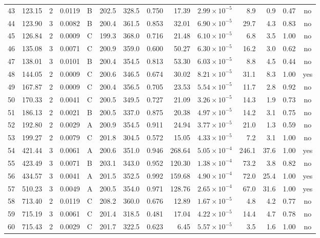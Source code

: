 \begin{landscape}
\begin{longtable}{rrrrlrrrrrrrrc}
43 & 123.15 & 2 & 0.0119 & B & 202.5 & 328.5 & 0.750 & 17.39 & $2.99\times10^{-5}$ & 8.9 & 0.9 & 0.47 & no \\
44 & 123.90 & 3 & 0.0082 & B & 200.4 & 361.5 & 0.853 & 32.01 & $6.90\times10^{-5}$ & 29.7 & 4.3 & 0.83 & no \\
45 & 126.84 & 2 & 0.0009 & C & 199.3 & 368.0 & 0.716 & 21.48 & $6.10\times10^{-5}$ & 6.8 & 3.5 & 1.00 & no \\
46 & 135.08 & 3 & 0.0071 & C & 200.9 & 359.0 & 0.600 & 50.27 & $6.30\times10^{-5}$ & 16.2 & 3.0 & 0.62 & no \\
47 & 138.01 & 3 & 0.0101 & B & 200.4 & 354.5 & 0.813 & 53.30 & $6.03\times10^{-5}$ & 8.8 & 4.5 & 0.44 & no \\
48 & 144.05 & 2 & 0.0009 & C & 200.6 & 346.5 & 0.674 & 30.02 & $8.21\times10^{-5}$ & 31.1 & 8.3 & 1.00 & yes \\
49 & 167.87 & 2 & 0.0009 & C & 200.4 & 356.5 & 0.705 & 23.53 & $5.54\times10^{-5}$ & 11.7 & 2.8 & 0.92 & no \\
50 & 170.33 & 2 & 0.0041 & C & 200.5 & 349.5 & 0.727 & 21.09 & $3.26\times10^{-5}$ & 14.3 & 1.9 & 0.73 & no \\
51 & 186.13 & 2 & 0.0021 & B & 200.5 & 337.0 & 0.875 & 20.38 & $4.97\times10^{-5}$ & 14.2 & 3.1 & 0.75 & no \\
52 & 192.80 & 2 & 0.0029 & A & 200.9 & 354.5 & 0.911 & 24.94 & $3.77\times10^{-5}$ & 21.0 & 1.3 & 0.59 & no \\
53 & 199.27 & 2 & 0.0079 & C & 201.8 & 304.5 & 0.572 & 15.05 & $4.33\times10^{-5}$ & 7.2 & 3.1 & 1.00 & no \\
54 & 421.44 & 3 & 0.0061 & A & 200.6 & 351.0 & 0.946 & 268.64 & $5.05\times10^{-4}$ & 246.1 & 37.6 & 1.00 & yes \\
55 & 423.49 & 3 & 0.0071 & B & 203.1 & 343.0 & 0.952 & 120.30 & $1.38\times10^{-4}$ & 73.2 & 3.8 & 0.82 & no \\
56 & 434.57 & 3 & 0.0041 & A & 201.5 & 352.5 & 0.992 & 159.68 & $4.90\times10^{-4}$ & 72.0 & 25.4 & 1.00 & yes \\
57 & 510.23 & 3 & 0.0049 & A & 200.5 & 354.0 & 0.971 & 128.76 & $2.65\times10^{-4}$ & 67.0 & 31.6 & 1.00 & yes \\
58 & 713.40 & 2 & 0.0119 & C & 208.2 & 360.0 & 0.676 & 12.89 & $1.67\times10^{-5}$ & 4.8 & 4.2 & 0.77 & no \\
59 & 715.19 & 3 & 0.0061 & C & 201.4 & 318.5 & 0.481 & 17.04 & $4.22\times10^{-5}$ & 14.4 & 4.7 & 0.78 & no \\
60 & 715.43 & 2 & 0.0029 & C & 201.7 & 322.5 & 0.623 & 6.45 & $5.57\times10^{-5}$ & 3.5 & 1.6 & 1.00 & no \\

\end{longtable}
\end{landscape}
